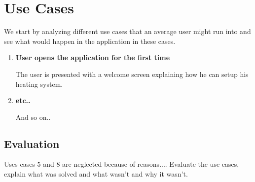\section{Use Cases}

We start by analyzing different use cases that an average user might run into and see what would happen in the application in these cases.

\begin{enumerate}
\item \textbf{User opens the application for the first time}

The user is presented with a welcome screen explaining how he can setup his heating system.
\item \textbf{etc..}

And so on..
\end{enumerate}

\subsection{Evaluation}

Uses cases 5 and 8 are neglected because of reasons.... Evaluate the use cases, explain what was solved and what wasn't and why it wasn't.

